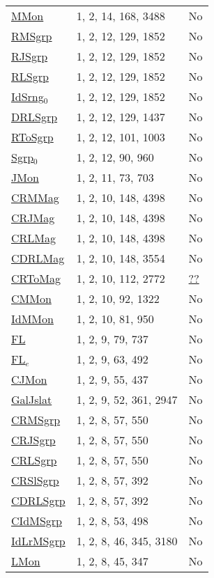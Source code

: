 {\begin{tabular}{|l|l|l|}
\hyperlink{MMon}{MMon}& 1, 2, 14, 168, 3488 &No\\
\hyperlink{RMSgrp}{RMSgrp}& 1, 2, 12, 129, 1852 &No\\
\hyperlink{RJSgrp}{RJSgrp}& 1, 2, 12, 129, 1852 &No\\
\hyperlink{RLSgrp}{RLSgrp}& 1, 2, 12, 129, 1852 &No\\
\hyperlink{IdSrng$_0$}{IdSrng$_0$}& 1, 2, 12, 129, 1852 &No\\
\hyperlink{DRLSgrp}{DRLSgrp}& 1, 2, 12, 129, 1437 &No\\
\hyperlink{RToSgrp}{RToSgrp}& 1, 2, 12, 101, 1003 &No\\
\hyperlink{Sgrp$_0$}{Sgrp$_0$}& 1, 2, 12, 90, 960 &No\\
\hyperlink{JMon}{JMon}& 1, 2, 11, 73, 703 &No\\
\hyperlink{CRMMag}{CRMMag}& 1, 2, 10, 148, 4398 &No\\
\hyperlink{CRJMag}{CRJMag}& 1, 2, 10, 148, 4398 &No\\
\hyperlink{CRLMag}{CRLMag}& 1, 2, 10, 148, 4398 &No\\
\hyperlink{CDRLMag}{CDRLMag}& 1, 2, 10, 148, 3554 &No\\
\hyperlink{CRToMag}{CRToMag}& 1, 2, 10, 112, 2772 &\href{http://oeis.org/A049505}{??}\\
\hyperlink{CMMon}{CMMon}& 1, 2, 10, 92, 1322 &No\\
\hyperlink{IdMMon}{IdMMon}& 1, 2, 10, 81, 950 &No\\
\hyperlink{FL}{FL}& 1, 2, 9, 79, 737 &No\\
\hyperlink{FL$_e$}{FL$_e$}& 1, 2, 9, 63, 492 &No\\
\hyperlink{CJMon}{CJMon}& 1, 2, 9, 55, 437 &No\\
\hyperlink{GalJslat}{GalJslat}& 1, 2, 9, 52, 361, 2947 &No\\
\hyperlink{CRMSgrp}{CRMSgrp}& 1, 2, 8, 57, 550 &No\\
\hyperlink{CRJSgrp}{CRJSgrp}& 1, 2, 8, 57, 550 &No\\
\hyperlink{CRLSgrp}{CRLSgrp}& 1, 2, 8, 57, 550 &No\\
\hyperlink{CRSlSgrp}{CRSlSgrp}& 1, 2, 8, 57, 392 &No\\
\hyperlink{CDRLSgrp}{CDRLSgrp}& 1, 2, 8, 57, 392 &No\\
\hyperlink{CIdMSgrp}{CIdMSgrp}& 1, 2, 8, 53, 498 &No\\
\hyperlink{IdLrMSgrp}{IdLrMSgrp}& 1, 2, 8, 46, 345, 3180 &No\\
\hyperlink{LMon}{LMon}& 1, 2, 8, 45, 347 &No\\

\end{tabular}}
